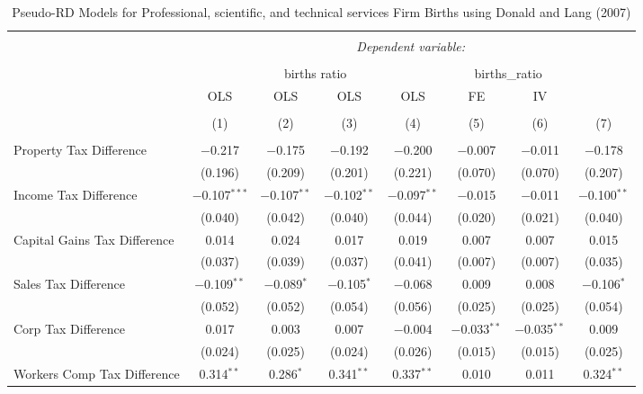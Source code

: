 
\begin{table}[!htbp] \centering 
  \caption{Pseudo-RD Models for  Professional, scientific, and technical services Firm Births using Donald and Lang (2007)} 
  \label{} 
\begin{tabular}{@{\extracolsep{5pt}}lccccccc} 
\\[-1.8ex]\hline 
\hline \\[-1.8ex] 
 & \multicolumn{7}{c}{\textit{Dependent variable:}} \\ 
\cline{2-8} 
\\[-1.8ex] & \multicolumn{4}{c}{births ratio} & \multicolumn{2}{c}{births\_ratio} &   \\ 
 & OLS & OLS & OLS & OLS & FE & IV &  \\ 
\\[-1.8ex] & (1) & (2) & (3) & (4) & (5) & (6) & (7)\\ 
\hline \\[-1.8ex] 
 Property Tax Difference & $-$0.217 & $-$0.175 & $-$0.192 & $-$0.200 & $-$0.007 & $-$0.011 & $-$0.178 \\ 
  & (0.196) & (0.209) & (0.201) & (0.221) & (0.070) & (0.070) & (0.207) \\ 
  Income Tax Difference & $-$0.107$^{***}$ & $-$0.107$^{**}$ & $-$0.102$^{**}$ & $-$0.097$^{**}$ & $-$0.015 & $-$0.011 & $-$0.100$^{**}$ \\ 
  & (0.040) & (0.042) & (0.040) & (0.044) & (0.020) & (0.021) & (0.040) \\ 
  Capital Gains Tax Difference & 0.014 & 0.024 & 0.017 & 0.019 & 0.007 & 0.007 & 0.015 \\ 
  & (0.037) & (0.039) & (0.037) & (0.041) & (0.007) & (0.007) & (0.035) \\ 
  Sales Tax Difference & $-$0.109$^{**}$ & $-$0.089$^{*}$ & $-$0.105$^{*}$ & $-$0.068 & 0.009 & 0.008 & $-$0.106$^{*}$ \\ 
  & (0.052) & (0.052) & (0.054) & (0.056) & (0.025) & (0.025) & (0.054) \\ 
  Corp Tax Difference & 0.017 & 0.003 & 0.007 & $-$0.004 & $-$0.033$^{**}$ & $-$0.035$^{**}$ & 0.009 \\ 
  & (0.024) & (0.025) & (0.024) & (0.026) & (0.015) & (0.015) & (0.025) \\ 
  Workers Comp Tax Difference & 0.314$^{**}$ & 0.286$^{*}$ & 0.341$^{**}$ & 0.337$^{**}$ & 0.010 & 0.011 & 0.324$^{**}$ \\ 

\end{tabular}
\end{table}
